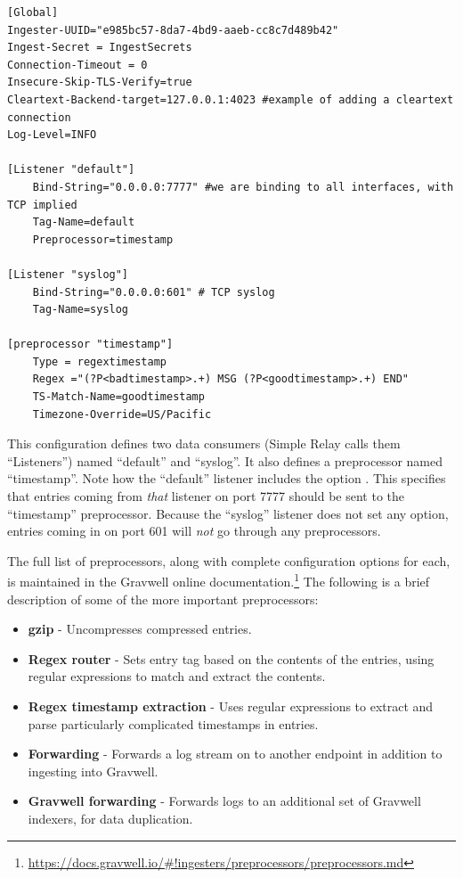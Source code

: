 \begin{verbatim}
[Global]
Ingester-UUID="e985bc57-8da7-4bd9-aaeb-cc8c7d489b42"
Ingest-Secret = IngestSecrets
Connection-Timeout = 0
Insecure-Skip-TLS-Verify=true
Cleartext-Backend-target=127.0.0.1:4023 #example of adding a cleartext connection
Log-Level=INFO

[Listener "default"]
    Bind-String="0.0.0.0:7777" #we are binding to all interfaces, with TCP implied
    Tag-Name=default
    Preprocessor=timestamp

[Listener "syslog"]
    Bind-String="0.0.0.0:601" # TCP syslog
    Tag-Name=syslog

[preprocessor "timestamp"]
    Type = regextimestamp
    Regex ="(?P<badtimestamp>.+) MSG (?P<goodtimestamp>.+) END"
    TS-Match-Name=goodtimestamp
    Timezone-Override=US/Pacific
\end{verbatim}

This configuration defines two data consumers (Simple Relay calls them ``Listeners'') named ``default'' and ``syslog''. It also defines a preprocessor named ``timestamp''. Note how the ``default'' listener includes the option . This specifies that entries coming from \emph{that} listener on port 7777 should be sent to the ``timestamp'' preprocessor. Because the ``syslog'' listener does not set any  option, entries coming in on port 601 will \emph{not} go through any preprocessors.

The full list of preprocessors, along with complete configuration options for each, is maintained in the Gravwell online documentation.\footnote{\href{https://docs.gravwell.io/\#!ingesters/preprocessors/preprocessors.md}{https://docs.gravwell.io/\#!ingesters/preprocessors/preprocessors.md}} The following is a brief description of some of the more important preprocessors:

\begin{itemize}
\item \textbf{gzip} - Uncompresses compressed entries.
\item \textbf{Regex router} - Sets entry tag based on the contents of the entries, using regular expressions to match and extract the contents.
\item \textbf{Regex timestamp extraction} - Uses regular expressions to extract and parse particularly complicated timestamps in entries.
\item \textbf{Forwarding} - Forwards a log stream on to another endpoint in addition to ingesting into Gravwell.
\item \textbf{Gravwell forwarding} - Forwards logs to an additional set of Gravwell indexers, for data duplication.
\end{itemize}

